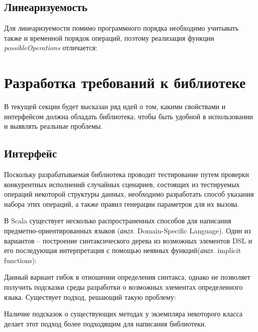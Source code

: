 \documentclass[14pt, openany]{book}
\begin{document}
\subsection{Линеаризуемость}
Для линеаризуемости помимо программного порядка необходимо учитывать также и временной порядок операций, поэтому реализация функции \emph{possibleOperations} отличается:


\section{Разработка требований к библиотеке}
В текущей секции будет высказан ряд идей о том, какими свойствами и интерфейсом должна обладать библиотека, чтобы быть удобной в использовании и выявлять реальные проблемы.

\subsection{Интерфейс}
Поскольку разрабатываемая библиотека проводит тестирование путем проверки конкурентных исполнений случайных сценариев, состоящих из тестируемых операций некоторой структуры данных, необходимо разработать способ указания набора этих операций, а также правил генерации параметров для их вызова. \par
В Scala существует несколько распространенных способов для написания предметно-ориентированных языков (\textit{англ.} Domain-Specific Language). Один из вариантов -- построение синтаксического дерева из возможных элементов DSL и его последующая интерпретация с помощью неявных функций(\textit{англ.} implicit functions):


Данный вариант гибок в отношении определения синтакса, однако не позволяет получить подсказки среды разработки о возможных элементах определенного языка. Существует подход, решающий такую проблему:

Наличие подсказок о существующих методах у экземпляра некоторого класса делает этот подход более подходящим для написания библиотеки.
\end{document}
